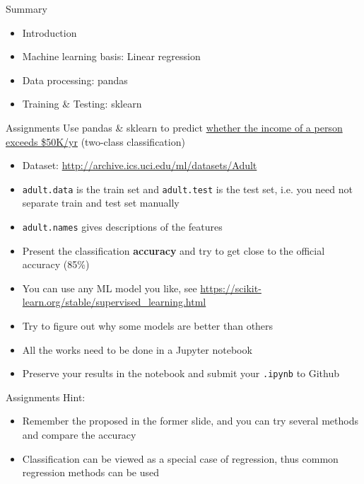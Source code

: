 \documentclass{../TexTemplate/myslide}
\begin{document}
\begin{frame}{Summary}
\begin{itemize}
	\item Introduction
	\item Machine learning basis: Linear regression
	\item Data processing: pandas
	\item Training \& Testing: sklearn
\end{itemize}
\end{frame}

\begin{frame}[fragile]{Assignments}
Use pandas \& sklearn to predict \underline{whether the income of a person exceeds \$50K/yr} (two-class classification)
\begin{itemize}
	\item Dataset: \url{http://archive.ics.uci.edu/ml/datasets/Adult}
	\item \verb'adult.data' is the train set and \verb'adult.test' is the test set, i.e. you need not separate train and test set manually
	\item \verb'adult.names' gives descriptions of the features
	\item Present the classification \textbf{accuracy} and try to get close to the official accuracy (85\%)
	\item You can use any ML model you like, see \url{https://scikit-learn.org/stable/supervised_learning.html}
	\item Try to figure out why some models are better than others
	\item All the works need to be done in a Jupyter notebook
	\item Preserve your results in the notebook and submit your \verb'.ipynb' to Github
\end{itemize}
\end{frame}

\begin{frame}{Assignments}
Hint:
\begin{itemize}
	\item Remember the proposed \hyperlink{hint}{} in the former slide, and you can try several methods and compare the accuracy
	\item Classification can be viewed as a special case of regression, thus common regression methods can be used
\end{itemize}
\end{frame}
\end{document}
